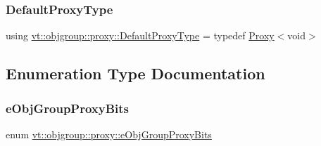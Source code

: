 \subsubsection{\texorpdfstring{Default\+Proxy\+Type}{DefaultProxyType}}
{\footnotesize\ttfamily using \hyperlink{namespacevt_1_1objgroup_1_1proxy_ac7e0a0acb3b31d5469a603de08192adc}{vt\+::objgroup\+::proxy\+::\+Default\+Proxy\+Type} = typedef \hyperlink{structvt_1_1objgroup_1_1proxy_1_1_proxy}{Proxy}$<$void$>$}



\subsection{Enumeration Type Documentation}
\mbox{\label{namespacevt_1_1objgroup_1_1proxy_a5cfde1a666e49070fcc0312e51d53777}} 
\subsubsection{\texorpdfstring{e\+Obj\+Group\+Proxy\+Bits}{eObjGroupProxyBits}}
{\footnotesize\ttfamily enum \hyperlink{namespacevt_1_1objgroup_1_1proxy_a5cfde1a666e49070fcc0312e51d53777}{vt\+::objgroup\+::proxy\+::e\+Obj\+Group\+Proxy\+Bits}}

